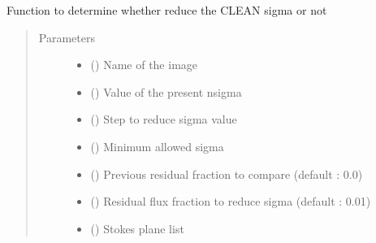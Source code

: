 \documentclass[letterpaper,10pt,english]{sphinxmanual}
\begin{document}
\begin{fulllineitems}
\begin{fulllineitems}
\label{\detokenize{paircars:paircars.fullpol_selfcal_LTS.PolSelfcal.reduce_sigma}}
\sphinxAtStartPar
Function to determine whether reduce the CLEAN sigma or not
\begin{quote}\begin{description}
\item[{Parameters}] \leavevmode\begin{itemize}
\item {} 
\sphinxAtStartPar
{} () \textendash{} Name of the image

\item {} 
\sphinxAtStartPar
{} () \textendash{} Value of the present n\sphinxhyphen{}sigma

\item {} 
\sphinxAtStartPar
{} () \textendash{} Step to reduce sigma value

\item {} 
\sphinxAtStartPar
{} () \textendash{} Minimum allowed sigma

\item {} 
\sphinxAtStartPar
{} () \textendash{} Previous residual fraction to compare (default : 0.0)

\item {} 
\sphinxAtStartPar
{} () \textendash{} Residual flux fraction to reduce sigma (default : 0.01)

\item {} 
\sphinxAtStartPar
{} () \textendash{} Stokes plane list


\end{itemize}
\end{description}
\end{quote}
\end{fulllineitems}
\end{fulllineitems}
\end{document}
